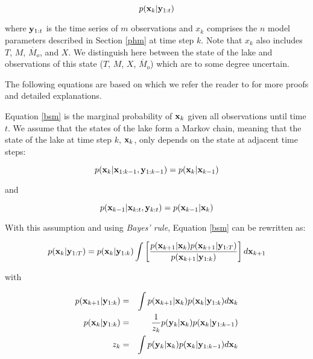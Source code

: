 \documentclass{bmc_template/bmcart}
\newcommand{\bm}[1]{{\bf #1}}
\begin{document}
\begin{equation}\label{bsm}
    p(\bm{x}_k|\bm{y}_{1:t})
\end{equation}

where $\bm{y}_{1:t}$ is the time series of $m$ observations and $x_k$ comprises
the $n$ model parameters described in Section \ref{phm} at time step $k$. Note
that $x_k$ also includes $T$, $M$, $\dot{M_o}$, and $X$. We distinguish here
between the state of the lake and observations of this state
($T$, $M$, $X$, $\dot{M_o}$) which are to some degree uncertain.

The following equations are based on \cite{sarkkaBayesianFilteringSmoothing2013}
which we refer the reader to for more proofs and detailed explanations.

Equation \ref{bsm} is the marginal probability of $\bm{x}_k$ given all
observations until time $t$. We assume that the states of the lake form a
Markov chain, meaning that the state of the lake at time step $k$, $\bm{x}_k$,
only depends on the state at adjacent time steps:

\begin{equation}\label{markov1}
    p(\bm{x}_k|\bm{x}_{1:k-1}, \bm{y}_{1:k-1}) = p(\bm{x}_k|\bm{x}_{k-1})
\end{equation}

and

\begin{equation}\label{markov2}
    p(\bm{x}_{k-1}|\bm{x}_{k:t}, \bm{y}_{k:t}) = p(\bm{x}_{k-1}|\bm{x}_{k})
\end{equation}

With this assumption and using \textit{Bayes' rule}, Equation \ref{bsm} can be
rewritten as:

\begin{equation}\label{bsm1}
p(\bm{x}_k|\bm{y}_{1:T}) = p(\bm{x}_k|\bm{y}_{1:k})
    \int\left[\frac{p(\bm{x}_{k+1}|\bm{x}_k)p(\bm{x}_{k+1}|\bm{y}_{1:T})}{p(\bm{x}_{k+1}|\bm{y}_{1:k})}\right]d\bm{x}_{k+1}
\end{equation}

with

\begin{eqnarray}\label{bfilt1}
p(\bm{x}_{k+1}|\bm{y}_{1:k}) & = & \int p(\bm{x}_{k+1}|\bm{x}_k)p(\bm{x}_k|\bm{y}_{1:k})d\bm{x}_k \\
        \label{bfilt}
    p(\bm{x}_k|\bm{y}_{1:k}) & = & \frac{1}{z_k} p(\bm{y}_k|\bm{x}_k)p(\bm{x}_k|\bm{y}_{1:k-1}) \\
        \label{zetk}
    z_k & = & \int p(\bm{y}_k|\bm{x}_k) p(\bm{x}_k| \bm{y}_{1:k-1}) d\bm{x}_k  
\end{eqnarray}
\end{document}
